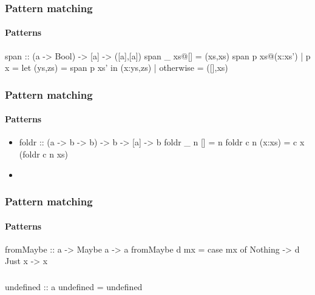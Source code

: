 \documentclass{beamer}
\begin{document}

\begin{frame}[fragile]
  \frametitle{Pattern matching}
  \framesubtitle{Patterns}

  \begin{example}
    \begin{code}
span :: (a -> Bool) -> [a] -> ([a],[a])
span _ xs@[]       = (xs,xs)
span p xs@(x:xs')
  | p x            = let (ys,zs) = span p xs' in (x:ys,zs)
  | otherwise      = ([],xs)
    \end{code}
  \end{example}
\end{frame}

\begin{frame}[fragile]
  \frametitle{Pattern matching}
  \framesubtitle{Patterns}

  \begin{example}
    \begin{itemize}
    \item
      \begin{code}
foldr :: (a -> b -> b) -> b -> [a] -> b
foldr _ n []     = n
foldr c n (x:xs) = c x (foldr c n xs)
      \end{code}
    \item
    \end{itemize}
  \end{example}
\end{frame}

\begin{frame}[fragile]
  \frametitle{Pattern matching}
  \framesubtitle{Patterns}

  \begin{example}
    \begin{code}
fromMaybe :: a -> Maybe a -> a
fromMaybe d mx =
  case mx of
    Nothing -> d
    Just x  -> x
    \end{code}
  \end{example}
\end{frame}


\begin{frame}[fragile]
  \frametitle{}

  \begin{code}
undefined :: a
undefined = undefined
  \end{code}
\end{frame}
\end{document}
